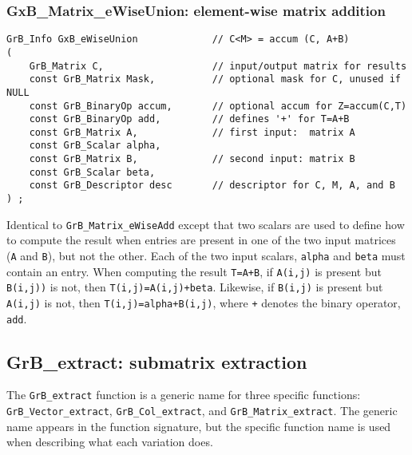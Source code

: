\documentclass[12pt]{article}
\begin{document}
{\newpage
\subsubsection{{\sf GxB\_Matrix\_eWiseUnion:} element-wise matrix addition}
\label{eWiseUnion_matrix}

\begin{mdframed}[userdefinedwidth=6in]
{\footnotesize
\begin{verbatim}
GrB_Info GxB_eWiseUnion             // C<M> = accum (C, A+B)
(
    GrB_Matrix C,                   // input/output matrix for results
    const GrB_Matrix Mask,          // optional mask for C, unused if NULL
    const GrB_BinaryOp accum,       // optional accum for Z=accum(C,T)
    const GrB_BinaryOp add,         // defines '+' for T=A+B
    const GrB_Matrix A,             // first input:  matrix A
    const GrB_Scalar alpha,
    const GrB_Matrix B,             // second input: matrix B
    const GrB_Scalar beta,
    const GrB_Descriptor desc       // descriptor for C, M, A, and B
) ;
\end{verbatim} } \end{mdframed}

Identical to \verb'GrB_Matrix_eWiseAdd' except that two scalars are used
to define how to compute the result when entries are present in one of
the two input matrices (\verb'A' and \verb'B'), but not the other.
Each of the two input scalars, \verb'alpha' and \verb'beta'
must contain an entry.
When computing the result \verb'T=A+B',
if \verb'A(i,j)' is present but \verb'B(i,j))' is not, then \verb'T(i,j)=A(i,j)+beta'.
Likewise,
if \verb'B(i,j)' is present but \verb'A(i,j)' is not, then \verb'T(i,j)=alpha+B(i,j)',
where \verb'+' denotes the binary operator, \verb'add'.

\newpage
\subsection{{\sf GrB\_extract:} submatrix extraction } %
\label{extract}

The \verb'GrB_extract' function is a generic name for three specific functions:
\verb'GrB_Vector_extract', \verb'GrB_Col_extract', and
\verb'GrB_Matrix_extract'.  The generic name appears in the function signature,
but the specific function name is used when describing what each variation
does.

}
\end{document}
